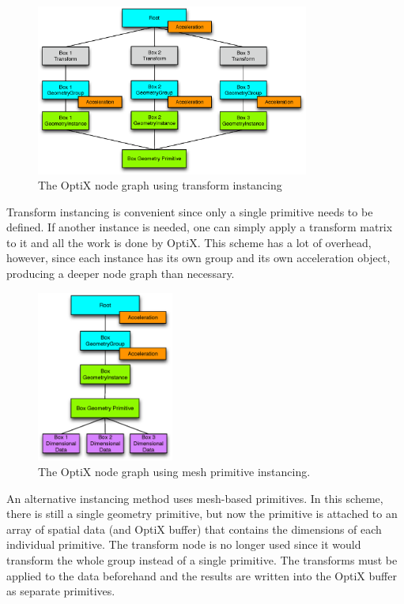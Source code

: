 \begin{figure}[h!] 
  \centering
    \includegraphics[width=0.8\textwidth]{graphics/transform_instancing.eps}
     \caption{The OptiX node graph using transform instancing \label{transform_instancing} }
\end{figure}

Transform instancing is convenient since only a single primitive needs to be defined.  If another instance is needed, one can simply apply a transform matrix to it and all the work is done by OptiX.  This scheme has a lot of overhead, however, since each instance has its own group and its own acceleration object, producing a deeper node graph than necessary.

\begin{figure}[h!] 
  \centering
    \includegraphics[width=0.4\textwidth]{graphics/primitive_instancing.eps}
     \caption{The OptiX node graph using mesh primitive instancing. \label{primitive_instancing} }
\end{figure}

An alternative instancing method uses mesh-based primitives.  In this scheme, there is still a single geometry primitive, but now the primitive is attached to an array of spatial data (and OptiX buffer) that contains the dimensions of each individual primitive.  The transform node is no longer used since it would transform the whole group instead of a single primitive.   The transforms must be applied to the data beforehand and the results are written into the OptiX buffer as separate primitives.  

